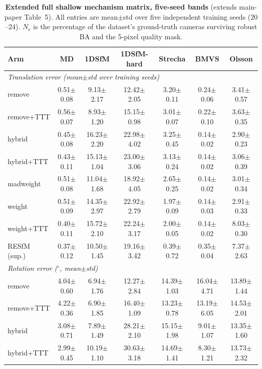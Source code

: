 \documentclass[10pt,twocolumn,letterpaper]{article}
\renewcommand{\deg}{^{\circ}}
\begin{document}
\begin{table}[t]\centering\footnotesize
\caption{\textbf{Extended full shallow mechanism matrix, five-seed bands} (extends
main-paper Table~5). All entries are mean$\pm$std over five independent training seeds
($20$--$24$). $N_r$ is the percentage of the dataset's ground-truth cameras
surviving robust BA and the 5-pixel quality mask.}
\label{tab:x_matrix}
\setlength{\tabcolsep}{3pt}%
\begin{tabular}{lcccccc}
\toprule
Arm & MD & 1DSfM & 1DSfM-hard & Strecha & BMVS & Olsson\\
\midrule
\multicolumn{7}{l}{\emph{Translation error (mean$\pm$std over training seeds)}}\\[1pt]
remove & 0.51$\pm$0.08 & 9.13$\pm$2.17 & 12.42$\pm$2.05 & 3.20$\pm$0.11 & 0.24$\pm$0.06 & 3.41$\pm$0.57\\
remove+TTT & 0.56$\pm$0.07 & 8.93$\pm$1.20 & 15.15$\pm$0.98 & 3.01$\pm$0.07 & 0.22$\pm$0.10 & 3.63$\pm$0.35\\
hybrid & 0.45$\pm$0.08 & 16.23$\pm$2.20 & 22.98$\pm$4.02 & 3.25$\pm$0.45 & 0.14$\pm$0.02 & 2.90$\pm$0.23\\
hybrid+TTT & 0.43$\pm$0.11 & 15.13$\pm$1.04 & 23.00$\pm$3.06 & 3.13$\pm$0.24 & 0.14$\pm$0.02 & 3.06$\pm$0.39\\
madweight & 0.51$\pm$0.08 & 11.04$\pm$1.68 & 18.92$\pm$4.05 & 2.65$\pm$0.25 & 0.14$\pm$0.02 & 3.01$\pm$0.34\\
weight & 0.51$\pm$0.09 & 14.35$\pm$2.97 & 22.92$\pm$2.79 & 1.97$\pm$0.09 & 0.14$\pm$0.03 & 2.91$\pm$0.33\\
weight+TTT & 0.40$\pm$0.11 & 15.72$\pm$2.10 & 22.24$\pm$3.17 & 2.00$\pm$0.05 & 0.14$\pm$0.02 & 8.03$\pm$0.30\\
RESfM (sup.) & 0.37$\pm$0.12 & 10.50$\pm$1.45 & 19.16$\pm$3.42 & 0.39$\pm$0.72 & 0.35$\pm$0.04 & 7.37$\pm$2.63\\
\midrule
\multicolumn{7}{l}{\emph{Rotation error ($\deg$, mean$\pm$std)}}\\[1pt]
remove & 4.04$\pm$0.60 & 6.94$\pm$1.76 & 12.27$\pm$2.84 & 14.39$\pm$1.03 & 16.04$\pm$4.71 & 13.89$\pm$1.44\\
remove+TTT & 4.22$\pm$0.36 & 6.90$\pm$1.85 & 16.40$\pm$1.09 & 13.23$\pm$0.78 & 13.19$\pm$6.05 & 14.53$\pm$2.01\\
hybrid & 3.08$\pm$0.71 & 7.89$\pm$1.49 & 28.21$\pm$2.10 & 15.15$\pm$1.98 & 9.01$\pm$1.07 & 13.35$\pm$1.60\\
hybrid+TTT & 2.99$\pm$0.45 & 10.19$\pm$1.10 & 30.63$\pm$3.18 & 14.69$\pm$1.41 & 8.30$\pm$1.21 & 13.73$\pm$2.32\\

\end{tabular}
\end{table}
\end{document}
